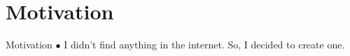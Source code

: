 \section{Motivation}
\begin{frame}{Motivation}
$\bullet$ I didn't find anything in the internet. So, I decided to create one. 
\end{frame}